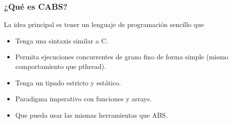 \documentclass[spanish, a4paper, 12pt, final, slideColor, nototal, colorBG, pdf, noaccumulate, darkblue] {beamer}
\begin{document}
\begin{frame}
  \frametitle{¿Qué es CABS?}
  La idea principal es tener un lenguaje de programación sencillo que
  \begin{itemize}
    \item Tenga una sintaxis similar a C.
    \item Permita ejecuciones concurrentes de grano fino de forma simple (mismo comportamiento que pthread).
    \item Tenga un tipado estricto y estático.
    \item Paradigma imperativo con funciones y arrays.
    \item Que pueda usar las mismas herramientas que ABS.
  \end{itemize}
\end{frame}
\end{document}
